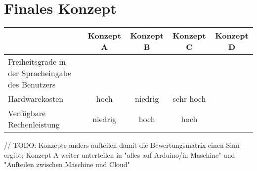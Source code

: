 \section{Finales Konzept}
\begin{tabular}[H]{l|c|c|c|c}
                                                      & Konzept A & Konzept B & Konzept C & Konzept D \\
    \hline
    Freiheitsgrade in der Spracheingabe des Benutzers &           &           &           &           \\
    \hline
    Hardwarekosten                                    & hoch      & niedrig   & sehr hoch &           \\
    \hline
    Verfügbare Rechenleistung                         & niedrig   & hoch      & hoch      &           \\
\end{tabular}
// TODO: Konzepte anders aufteilen damit die Bewertungsmatrix einen Sinn ergibt;
Konzept A weiter unterteilen in "alles auf Arduino/in Maschine" und "Aufteilen zwischen Maschine und Cloud"
\endinput




